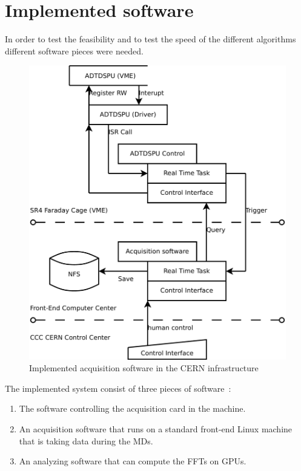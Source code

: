 \chapter{Implemented software}

In order to test the feasibility and to test the speed of the different algorithms different software pieces were needed.

\begin{figure}[H]
\caption{Implemented acquisition software in the CERN infrastructure}
\centering
\includegraphics[scale=0.3]{ImplementedSoftFesa.pdf}
\end{figure}

The implemented system consist of three pieces of software~:
\begin{enumerate}
\item The software controlling the acquisition card in the machine.
\item An acquisition software that runs on a standard front-end Linux machine that is taking data during the \glspl{MD}.
\item An analyzing software that can compute the \glspl{FFT} on \glspl{GPU}.
\end{enumerate}

